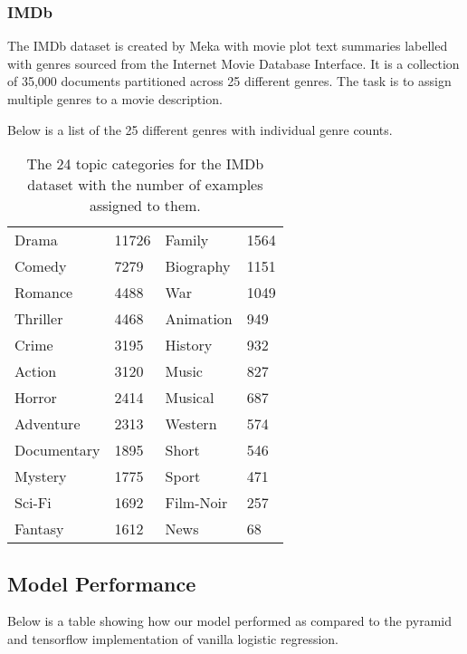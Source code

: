 \newpage
\subsubsection{IMDb}

The IMDb dataset is created by Meka with movie plot text summaries labelled with genres sourced from the Internet Movie Database Interface. It is a collection of 35,000 documents partitioned across 25 different genres. The task is to assign multiple genres to a movie description.

Below is a list of the 25 different genres with individual genre counts.

\begin{table}[htbp]
\begin{tabular}{ll|ll}
Drama       & 11726 & Family    & 1564 \\
Comedy      & 7279  & Biography & 1151 \\
Romance     & 4488  & War       & 1049 \\
Thriller    & 4468  & Animation & 949  \\
Crime       & 3195  & History   & 932  \\
Action      & 3120  & Music     & 827  \\
Horror      & 2414  & Musical   & 687  \\
Adventure   & 2313  & Western   & 574  \\
Documentary & 1895  & Short     & 546  \\
Mystery     & 1775  & Sport     & 471  \\
Sci-Fi      & 1692  & Film-Noir & 257  \\
Fantasy     & 1612  & News      & 68  
\end{tabular}
\caption{\label{tab:widgets}The 24 topic categories for the IMDb dataset with the number of examples assigned to them.}
\end{table}


\newpage
\subsection{Model Performance}

Below is a table showing how our model performed as compared to the pyramid and tensorflow implementation of vanilla logistic regression.

